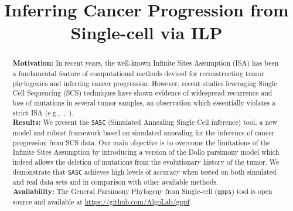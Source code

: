 \documentclass[a4paper,USenglish]{article}
\newcommand{\eg}{e.g.,~}
\theoremstyle{definition}
\begin{document}
\title{Inferring Cancer Progression from Single-cell via ILP}

\maketitle

\begin{abstract}
\textbf{Motivation:} In recent years, the well-known Infinite Sites Assumption (ISA) has been a fundamental feature of computational methods devised for reconstructing tumor phylogenies and inferring cancer progression. However, recent studies leveraging Single Cell Sequencing (SCS) techniques have shown evidence of widespread recurrence and loss of mutations in several tumor samples, an observation which essentially violates a strict ISA (\eg,~\cite{Kuipers13102017}).\\
\textbf{Results:} We present the \texttt{SASC} (Simulated Annealing Single Cell inference) tool, a new model and robust framework based on simulated annealing for the inference of cancer progression from SCS data.
	Our main objective is to overcome the limitations of the Infinite Sites Assumption by introducing a version of the Dollo parsimony model which indeed allows the deletion of mutations from the evolutionary history of the tumor. 
	We demonstrate that \texttt{SASC} achieves high levels of accuracy when tested on both simulated and real data sets and in comparison with other available methods.\\
\textbf{Availability:} The General Parsimony Phylogeny from Single-cell (\texttt{gpps})
tool is open source and available at   \url{https://github.com/AlgoLab/gppf}.\\
\end{abstract}
\end{document}
